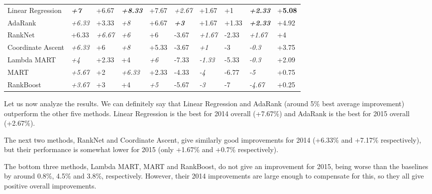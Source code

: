 \begin{table}[h!]
{\begin{tabular}{@{}llllllllll@{}}
Linear Regression & \textit{\textbf{+7}} & +6.67             & \textit{\textbf{+8.33}}   & +7.67              	& \textit{+2.67}       	& +1.67    		& +1          & \textit{\textbf{+2.33}}   & +\textbf{5.08}  \\
AdaRank           & \textit{+6.33}       & +3.33             & \textit{+8}               & +6.67              	& \textit{\textbf{+3}}	& +1.67         	& +1.33       & \textit{\textbf{+2.33}}   & +4.92  \\
RankNet           & +6.33             	 & \textit{+6.67}    & \textit{+6}               & +6                 	& -3.67       		& \textit{+1.67}        & -2.33       & \textit{+1.67}            & +4  \\
Coordinate Ascent & \textit{+6.33}       & +6                & \textit{+8}               & +5.33              	& -3.67      		& \textit{+1}           & -3          & \textit{-0.3}             & +3.75  \\
Lambda MART	  & \textit{+4}		 & +2.33	     & +4		         & \textit{+6}	   	& -7.33			& \textit{-1.33}	& -5.33	      & \textit{-0.3}		  & +2.09  \\
MART	 	  & \textit{+5.67}	 & +2		     & \textit{+6.33}	         & +2.33		& -4.33			& \textit{-4}		& -6.77	      & \textit{-5}		  & +0.75 \\
RankBoost	  & \textit{+3.67}	 & +3		     & +4		         & \textit{+5}		& -5.67			& \textit{-3}		& -7	      & \textit{-4.67}		  & +0.25 \\

\bottomrule
\end{tabular}%
}
\end{table}

Let us now analyze the results. We can definitely say that Linear Regression and AdaRank (around 5\% best average improvement)
outperform the other five methods. Linear Regression is the best for 2014 overall (+7.67\%) and
AdaRank is the best for 2015 overall (+2.67\%).

The next two methods, RankNet and Coordinate Ascent, give similarly good
improvements for 2014 (+6.33\% and +7.17\% respectively), but their performance is somewhat lower
for 2015 (only +1.67\% and +0.7\% respectively).

The bottom three methods, Lambda MART, MART and RankBoost, do not give an improvement for 2015, being worse
than the baselines by around 0.8\%, 4.5\% and 3.8\%, respectively. However, their 2014 improvements are large enough to compensate
for this, so they all give positive overall improvements.

